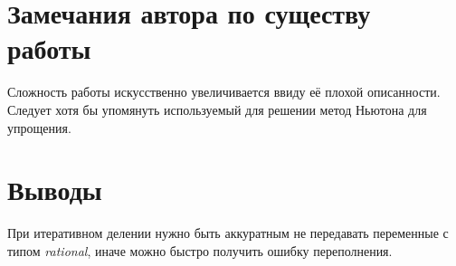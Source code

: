 \documentclass[12pt]{article}
\begin{document}
\section{Замечания автора по существу работы}
Сложность работы искусственно увеличивается ввиду её плохой описанности. Следует
хотя бы упомянуть используемый для решении метод Ньютона для упрощения.

\section{Выводы}
При итеративном делении нужно быть аккуратным не передавать переменные с типом \textit{rational},
иначе можно быстро получить ошибку переполнения.
\end{document}
